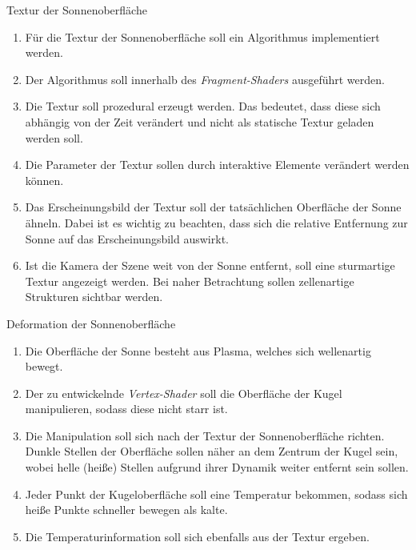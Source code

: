 \documentclass{article}
\begin{document}
\begin{enumerate}
    {\bfseries\large\item Textur der Sonnenoberfläche}
    \begin{enumerate}
      \item Für die Textur der Sonnenoberfläche soll ein Algorithmus
        implementiert werden.
      \item Der Algorithmus soll innerhalb des \textit{Fragment-Shaders}
        ausgeführt werden.
      \item Die Textur soll prozedural erzeugt werden. Das bedeutet, dass diese sich
        abhängig von der Zeit verändert und nicht als statische Textur geladen
        werden soll.
      \item Die Parameter der Textur sollen durch interaktive Elemente
        verändert werden können.
      \item Das Erscheinungsbild der Textur soll der tatsächlichen Oberfläche
        der Sonne ähneln. Dabei ist es wichtig zu beachten, dass sich die
        relative Entfernung zur Sonne auf das Erscheinungsbild auswirkt.
      \item Ist die Kamera der Szene weit von der Sonne entfernt, soll eine
        sturmartige Textur angezeigt werden. Bei naher Betrachtung sollen
        zellenartige Strukturen sichtbar werden.
    \end{enumerate}

    \vspace{0.5cm}

    {\bfseries\large\item Deformation der Sonnenoberfläche}
    \begin{enumerate}
      \item Die Oberfläche der Sonne besteht aus Plasma, welches sich
        wellenartig bewegt.
      \item Der zu entwickelnde \textit{Vertex-Shader} soll die Oberfläche der
        Kugel manipulieren, sodass diese nicht starr ist.
      \item Die Manipulation soll sich nach der Textur der Sonnenoberfläche
        richten. Dunkle Stellen der Oberfläche sollen näher an dem Zentrum der
        Kugel sein, wobei helle (heiße) Stellen aufgrund ihrer Dynamik weiter
        entfernt sein sollen.
      \item Jeder Punkt der Kugeloberfläche soll eine Temperatur bekommen,
        sodass sich heiße Punkte schneller bewegen als kalte.
      \item Die Temperaturinformation soll sich ebenfalls aus der Textur
        ergeben.
    \end{enumerate}


\end{enumerate}
\end{document}
